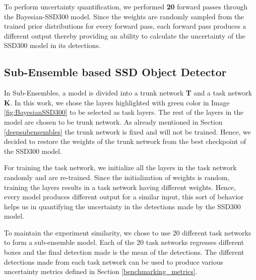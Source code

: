     To perform uncertainty quantification, we performed \textbf{20} forward passes through the Bayesian-SSD300 model. Since the weights are randomly sampled from the trained prior distributions for every forward pass, each forward pass produces a different output thereby providing an ability to calculate the uncertainty of the SSD300 model in its detections. 
    
    
    \subsection{Sub-Ensemble based SSD Object Detector}
    \label{SSD-subEnsemble}
    In Sub-Ensembles, a model is divided into a trunk network \textbf{T} and a task network \textbf{K}. In this work, we chose the layers highlighted with green color in Image \ref{fig:BayesianSSD300} to be selected as task layers. The rest of the layers in the model are chosen to be trunk network. As already mentioned in Section \ref{deepsubensembles} the trunk network is fixed and will not be trained. Hence, we decided to restore the weights of the trunk network from the best checkpoint of the SSD300 model. 
    
    For training the task network, we initialize all the layers in the task network randomly and are re-trained. Since the initialization of weights is random, training the layers results in a task network having different weights. Hence, every model produces different output for a similar input, this sort of behavior helps us in quantifying the uncertainty in the detections made by the SSD300 model.
    
    To maintain the experiment similarity, we chose to use 20 different task networks to form a sub-ensemble model. Each of the 20 task networks regresses different boxes and the final detection made is the mean of the detections. The different detections made from each task network can be used to produce various uncertainty metrics defined in Section \ref{benchmarking_metrics}.


